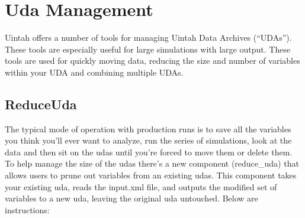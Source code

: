 \chapter{Uda Management } \label{Chapter:UDA}
Uintah offers a number of tools for managing Uintah Data Archives (``UDAs''). These tools are especially useful for large simulations with large output.  These tools are used for quickly moving data, reducing the size and number of variables within your UDA and combining multiple UDAs. 

\section{ReduceUda}
The typical mode of operation with production runs is to save all the variables you think you'll ever
want to analyze, run the series of simulations, look at the data and then sit on the udas until you're
 forced to move them or delete them.  To help manage the size of the udas there's a new component
(reduce\_uda) that allows users to prune out variables from an existing udas.   This component takes your existing uda,
reads the input.xml file, and outputs the modified set of variables to a new uda, leaving the original uda untouched.
Below are instructions:

